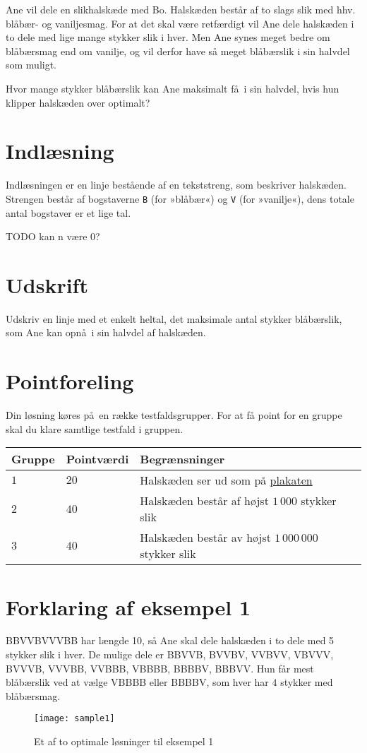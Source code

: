 Ane vil dele en slikhalskæde med Bo.
Halskæden består af to slags slik med hhv. blåbær- og vaniljesmag.
For at det skal være retfærdigt vil Ane dele halskæden i to dele med lige mange stykker slik i hver.
Men Ane synes meget bedre om blåbærsmag end om vanilje, og vil derfor have så meget blåbærslik i sin halvdel som muligt.

Hvor mange stykker blåbærslik kan Ane maksimalt få i sin halvdel, hvis hun klipper halskæden over optimalt?

\section*{Indlæsning}
Indlæsningen er en linje bestående af en tekststreng, som beskriver halskæden.
Strengen består af bogstaverne \texttt{B} (for »blåbær«) og \texttt{V} (for »vanilje«), dens totale antal bogstaver er et lige tal.

TODO kan n være 0?

\section*{Udskrift}
Udskriv en linje med et enkelt heltal, det maksimale antal stykker blåbærslik, som Ane kan opnå i sin halvdel af halskæden.

\section*{Pointforeling}

Din løsning køres på en række testfaldsgrupper.
For at få point for en gruppe skal du klare samtlige testfald i gruppen.

\noindent
\begin{tabular}{| l | l | l |}
\hline
Gruppe & Pointværdi & Begrænsninger \\ \hline
$1$   & $20$       & Halskæden ser ud som på \href{https://www.progolymp.se/2020/affisch.pdf}{plakaten} \\ \hline
$2$   & $40$       & Halskæden består af højst $1\,000$ stykker slik\\ \hline
$3$   & $40$       & Halskæden består av højst $1\,000\,000$ stykker slik \\ \hline
\end{tabular}

\section*{Forklaring af eksempel 1}
BBVVBVVVBB har længde 10, så Ane skal dele halskæden i to dele med 5 stykker slik i hver.
De mulige dele er BBVVB, BVVBV, VVBVV, VBVVV, BVVVB, VVVBB, VVBBB, VBBBB, BBBBV, BBBVV.
Hun får mest blåbærslik  ved at vælge VBBBB eller BBBBV, som hver har $4$ stykker med blåbærsmag.

\begin{figure}[h]
	\centering
\texttt{[image: sample1]}
\caption{Et af to optimale løsninger til eksempel 1}
\end{figure}
